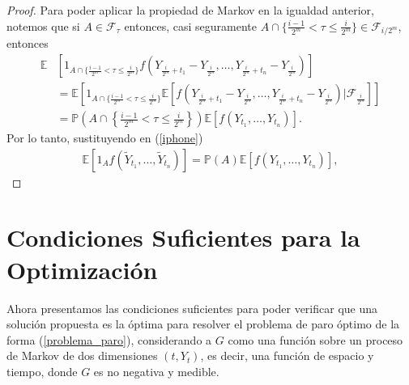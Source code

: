 \begin{proof}
Para poder aplicar la propiedad de Markov en la igualdad anterior, notemos que si $A \in \mathcal{F}_{\tau}$ entonces, casi seguramente $A \cap \{\frac{i-1}{2^m} < \tau \leq \frac{i}{2^m}\} \in \mathcal{F}_{i/2^m}$, entonces
\begin{align*}
	\mathbb{E} & \left[ 1_{ A \cap \{\frac{i-1}{2^m} < \tau \leq \frac{i}{2^m}\}} f \left( Y_{\frac{i}{2^m} + t_1} - Y_{\frac{i}{2^m}}, \ldots, Y_{\frac{i}{2^m} + t_n} - Y_{\frac{i}{2^m}}  \right) \right] \\
	& = \mathbb{E} \left[ 1_{ A \cap \{\frac{i-1}{2^m} < \tau \leq \frac{i}{2^m}\}} \mathbb{E} \left[ f \left( Y_{\frac{i}{2^m} + t_1} - Y_{\frac{i}{2^m}}, \ldots, Y_{\frac{i}{2^m} + t_n} - Y_{\frac{i}{2^m}}  \right) \bigg| \mathcal{F}_{ \frac{i}{2^m} } \right] \right] \\
	& = \mathbb{P} \left( A \cap \left\{ \frac{i-1}{2^m} < \tau \leq \frac{i}{2^m} \right\} \right) \mathbb{E} \left[ f \left( Y_{t_1}, \ldots, Y_{t_n} \right) \right].
	\end{align*}
Por lo tanto, sustituyendo en (\ref{iphone})
	\begin{align*}
	\mathbb{E} \left[ 1_A f \left( \tilde{Y}_{t_1}, \ldots, \tilde{Y}_{t_n} \right) \right] = \mathbb{P} (A) \mathbb{E} \left[ f \left( Y_{t_1}, \ldots, Y_{t_n} \right) \right], 
	\end{align*}
\end{proof}

\section{Condiciones Suficientes para la Optimización}
Ahora presentamos las condiciones suficientes para poder verificar que una solución propuesta es la óptima para resolver el problema de paro óptimo de la forma (\ref{problema_paro}), considerando a $G$ como una función sobre un proceso de Markov de dos dimensiones $(t, Y_t)$, es decir, una función de espacio y tiempo, donde $G$ es no negativa y medible.\\


